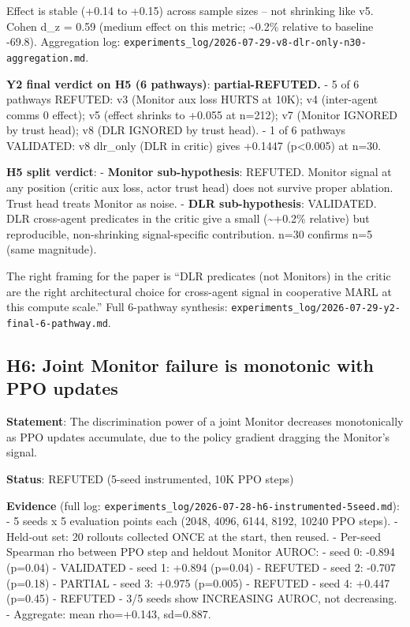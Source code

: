 \documentclass[
]{article}
\begin{document}
Effect is stable (+0.14 to +0.15) across sample sizes -- not shrinking
like v5. Cohen d\_z = 0.59 (medium effect on this metric;
\textasciitilde0.2\% relative to baseline -69.8). Aggregation log:
\texttt{experiments\_log/2026-07-29-v8-dlr-only-n30-aggregation.md}.

\textbf{Y2 final verdict on H5 (6 pathways)}: \textbf{partial-REFUTED.}
- 5 of 6 pathways REFUTED: v3 (Monitor aux loss HURTS at 10K); v4
(inter-agent comms 0 effect); v5 (effect shrinks to +0.055 at n=212); v7
(Monitor IGNORED by trust head); v8 (DLR IGNORED by trust head). - 1 of
6 pathways VALIDATED: v8 dlr\_only (DLR in critic) gives +0.1447
(p\textless0.005) at n=30.

\textbf{H5 split verdict}: - \textbf{Monitor sub-hypothesis}: REFUTED.
Monitor signal at any position (critic aux loss, actor trust head) does
not survive proper ablation. Trust head treats Monitor as noise. -
\textbf{DLR sub-hypothesis}: VALIDATED. DLR cross-agent predicates in
the critic give a small (\textasciitilde+0.2\% relative) but
reproducible, non-shrinking signal-specific contribution. n=30 confirms
n=5 (same magnitude).

The right framing for the paper is ``DLR predicates (not Monitors) in
the critic are the right architectural choice for cross-agent signal in
cooperative MARL at this compute scale.'' Full 6-pathway synthesis:
\texttt{experiments\_log/2026-07-29-y2-final-6-pathway.md}.

\subsection{H6: Joint Monitor failure is monotonic with PPO
updates}\label{h6-joint-monitor-failure-is-monotonic-with-ppo-updates}

\textbf{Statement}: The discrimination power of a joint Monitor
decreases monotonically as PPO updates accumulate, due to the policy
gradient dragging the Monitor's signal.

\textbf{Status}: REFUTED (5-seed instrumented, 10K PPO steps)

\textbf{Evidence} (full log:
\texttt{experiments\_log/2026-07-28-h6-instrumented-5seed.md}): - 5
seeds x 5 evaluation points each (2048, 4096, 6144, 8192, 10240 PPO
steps). - Held-out set: 20 rollouts collected ONCE at the start, then
reused. - Per-seed Spearman rho between PPO step and heldout Monitor
AUROC: - seed 0: -0.894 (p=0.04) - VALIDATED - seed 1: +0.894 (p=0.04) -
REFUTED - seed 2: -0.707 (p=0.18) - PARTIAL - seed 3: +0.975 (p=0.005) -
REFUTED - seed 4: +0.447 (p=0.45) - REFUTED - 3/5 seeds show INCREASING
AUROC, not decreasing. - Aggregate: mean rho=+0.143, sd=0.887.
\end{document}
